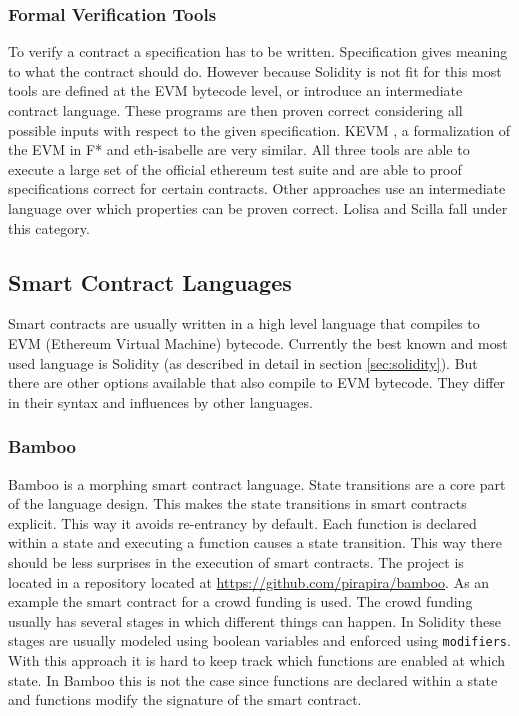 \documentclass[a4paper]{article}
\begin{document}
\subsubsection{Formal Verification Tools}
To verify a contract a specification has to be written. Specification gives meaning to what the contract should do. However because Solidity is not fit for this most tools are defined at the EVM bytecode level, or introduce an intermediate contract language. These programs are then proven correct considering all possible inputs with respect to the given specification. KEVM \cite{hildenbrandt2017kevm}, a formalization of the EVM in F* \cite{grishchenko2018semantic} and eth-isabelle \cite{hirai2017defining} are very similar. All three tools are able to execute a large set of the official ethereum test suite and are able to proof specifications correct for certain contracts. Other approaches use an intermediate language over which properties can be proven correct. Lolisa \cite{yang2018lolisa} and Scilla \cite{sergey2018scilla} fall under this category. 

\subsection{Smart Contract Languages}
Smart contracts are usually written in a high level language that compiles to EVM (Ethereum Virtual Machine) bytecode. Currently the best known and most used language is Solidity (as described in detail in section \ref{sec:solidity}). But there are other options available that also compile to EVM bytecode. They differ in their syntax and influences by other languages.  
\subsubsection{Bamboo}
Bamboo is a morphing smart contract language. State transitions are a core part of the language design. This makes the state transitions in smart contracts explicit. This way it avoids re-entrancy by default. Each function is declared within a state and executing a function causes a state transition. This way there should be less surprises in the execution of smart contracts. The project is located in a repository located at \url{https://github.com/pirapira/bamboo}. As an example the smart contract for a crowd funding is used. The crowd funding usually has several stages in which different things can happen. In Solidity these stages are usually modeled using boolean variables and enforced using \texttt{modifiers}. With this approach it is hard to keep track which functions are enabled at which state. In Bamboo this is not the case since functions are declared within a state and functions modify the signature of the smart contract. 
\end{document}
